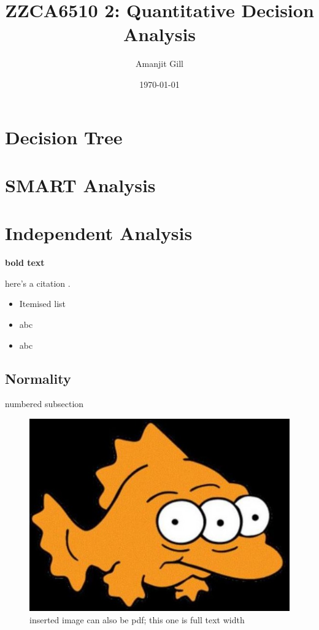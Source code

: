 \documentclass[11pt, a4paper]{article}
\title{\Large\bfseries ZZCA6510 2: Quantitative Decision Analysis}
\author{\large Amanjit Gill}
\date{\small \today}
\begin{document}
    
    \maketitle

    \section{Decision Tree}

    \section{SMART Analysis}

    \section{Independent Analysis}
    
    
    
    
    
    
    
    
    
    \textbf{bold text}

    here's a citation \parencite{transformations}.

    \begin{itemize}
        \item Itemised list
        \item abc
        \item abc
    \end{itemize}

    \subsection{Normality}

    numbered subsection

    \begin{figure}[hbt!]
        \centering
        \includegraphics[width=\textwidth]{3uddg6.png}
        \caption{inserted image can also be pdf; this one is full text width}
        \label{imagename}
    \end{figure}
\end{document}
